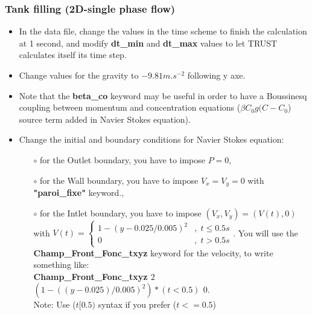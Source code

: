 \documentclass[10pt, hyperref={unicode=true,pdfusetitle, bookmarks=true,bookmarksnumbered=false,bookmarksopen=false, breaklinks=false,pdfborder={0 0 1},backref=true,colorlinks=true,linkcolor=darkblue,pageanchor}]{beamer}
\begin{document}
\begin{frame}
\frametitle{Tank filling (2D-single phase flow)}
\begin{block}{}

\begin{itemize}
\item In the data file, change the values in the time scheme to finish the calculation at 1
second, and modify \textbf{dt\_min} and \textbf{dt\_max} values to let TRUST calculates itself its
time step.

\item Change values for the gravity to $-9.81 m.s^{-2}$ following y axe.

\item Note that the \textbf{beta\_co} keyword may be useful in order to have a Boussinesq coupling between momentum and concentration equations ($\beta C_0 g(C-C_0$) source term added in Navier Stokes equation).

\item Change the initial and boundary conditions for Navier Stokes equation:
    \begin{itemize}
    \item [$\circ$] for the Outlet boundary, you have to impose $P=0$,
    \item [$\circ$] for the Wall boundary, you have to impose $V_x=V_y=0$ with \textbf{"paroi\_fixe"} keyword.,
    \item [$\circ$] for the Intlet boundary, you have to impose $(V_{x},V_{y})=(V(t),0)$ with 
    $V(t)=  
    \begin{cases}  
    1-(y-0.025/0.005)^{2} & ,\; t\leq0.5s\\
    0 & ,\; t>0.5s
    \end{cases}
    $. You will use the \textbf{Champ\_Front\_Fonc\_txyz} keyword for the velocity, to write something like: \\
    \textbf{Champ\_Front\_Fonc\_txyz $2$ $(1-((y-0.025)/0.005)^2)*(t<0.5)$ $0.$}\\
    Note: Use ($t[0.5)$ syntax if you prefer ($t<=0.5$)
    \end{itemize}
\end{itemize}

\end{block}
\end{frame}
\end{document}

